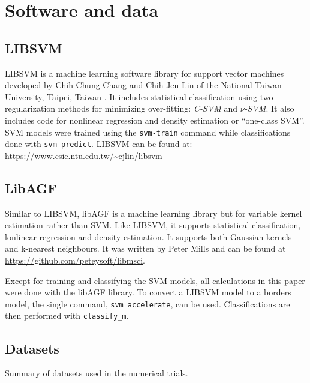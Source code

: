 \section{Software and data}

\label{methods}

\subsection{LIBSVM}

LIBSVM is a machine learning software library for support vector machines 
developed by Chih-Chung Chang and Chih-Jen Lin of 
the National Taiwan University, Taipei, Taiwan \citep{Chang_Lin2011}.
It includes statistical classification using two regularization methods 
for minimizing over-fitting: 
{\it C-SVM} and {\it $\nu$-SVM}.
It also includes code for nonlinear regression and density estimation or
``one-class SVM''.
SVM models were trained using the \verb/svm-train/ command while
classifications done with \verb/svm-predict/.
LIBSVM can be found at: \url{https://www.csie.ntu.edu.tw/~cjlin/libsvm}

\subsection{LibAGF}

Similar to LIBSVM, libAGF is a machine learning library but for variable kernel 
estimation \citep{Mills2011,Terrell_Scott1992} rather than SVM.
Like LIBSVM, it supports statistical classification, lonlinear regression
and density estimation.
It supports both Gaussian kernels and k-nearest neighbours.
It was written by Peter Mills and can be found at
\url{https://github.com/peteysoft/libmsci}.

Except for training and classifying the SVM models, all calculations in this paper were done 
with the libAGF library. To convert a LIBSVM model to a borders model,
the single command, \verb/svm_accelerate/, can be used.
Classifications are then performed with \verb/classify_m/.

\subsection{Datasets}

\label{datasets}

\begin{table}
	\caption{Summary of datasets used in the numerical trials.}
	\label{summary}
	
\end{table}

